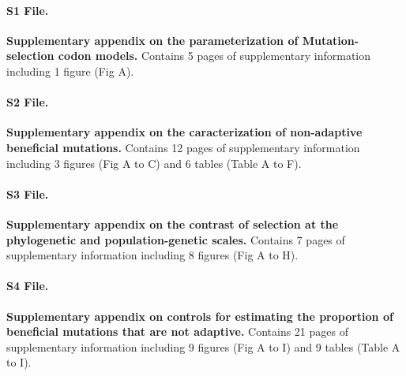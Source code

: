 \documentclass[10pt,letterpaper]{article}
\begin{document}
\paragraph*{S1 File.}
\label{S1_File}
{\bf Supplementary appendix on the parameterization of Mutation-selection codon models.} Contains 5 pages of supplementary information including 1 figure (Fig A).

\paragraph*{S2 File.}
\label{S2_File}
{\bf Supplementary appendix on the caracterization of non-adaptive beneficial mutations.} Contains 12 pages of supplementary information including 3 figures (Fig A to C) and 6 tables (Table A to F).

\paragraph*{S3 File.}
\label{S3_File}
{\bf Supplementary appendix on the contrast of selection at the phylogenetic and population-genetic scales.} Contains 7 pages of supplementary information including 8 figures (Fig A to H).

\paragraph*{S4 File.}
\label{S4_File}
{\bf Supplementary appendix on controls for estimating the proportion of beneficial mutations that are not adaptive.} Contains 21 pages of supplementary information including 9 figures (Fig A to I) and 9 tables (Table A to I).
\end{document}
